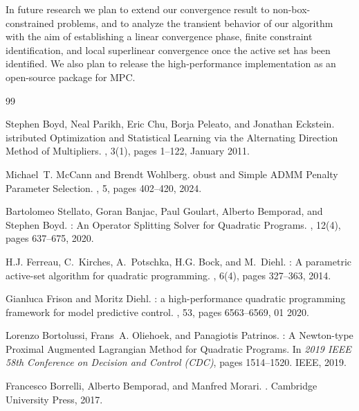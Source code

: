 \documentclass[letterpaper, 10 pt, conference]{ieeeconf}  %
\begin{document}
In future research we plan to extend our convergence result to non-box-constrained 
problems, and to analyze the transient behavior of our algorithm with the aim of 
establishing a linear convergence phase, finite constraint identification, and local 
superlinear convergence once the active set has been identified. We also plan to 
release the high-performance implementation as an open-source package for MPC.



\begin{thebibliography}{99}

Stephen Boyd, Neal Parikh, Eric Chu, Borja Peleato, and Jonathan Eckstein.
istributed {O}ptimization and {S}tatistical {L}earning via the
  {A}lternating {D}irection {M}ethod of {M}ultipliers.
, 3(1), pages 1--122, January 2011.

Michael~T. McCann and Brendt Wohlberg.
obust and {S}imple {ADMM} {P}enalty {P}arameter {S}election.
, 5, pages 402--420, 2024.

Bartolomeo Stellato, Goran Banjac, Paul Goulart, Alberto Bemporad, and Stephen
  Boyd.
: {A}n {O}perator {S}plitting {S}olver for {Q}uadratic
  {P}rograms.
, 12(4), pages 637--675, 2020.

H.J. Ferreau, C.~Kirches, A.~Potschka, H.G. Bock, and M.~Diehl.
: A parametric active-set algorithm for quadratic
  programming.
, 6(4), pages 327--363, 2014.

Gianluca Frison and Moritz Diehl.
: a high-performance quadratic programming framework for model
  predictive control.
, 53, pages 6563--6569, 01 2020.

Lorenzo Bortolussi, Frans~A. Oliehoek, and Panagiotis Patrinos.
: {A} {N}ewton-type {P}roximal {A}ugmented {L}agrangian
  {M}ethod for {Q}uadratic {P}rograms.
\newblock In {\em 2019 IEEE 58th Conference on Decision and Control (CDC)},
  pages 1514--1520. IEEE, 2019.

Francesco Borrelli, Alberto Bemporad, and Manfred Morari.
.
\newblock Cambridge University Press, 2017.


\end{thebibliography}
\end{document}

